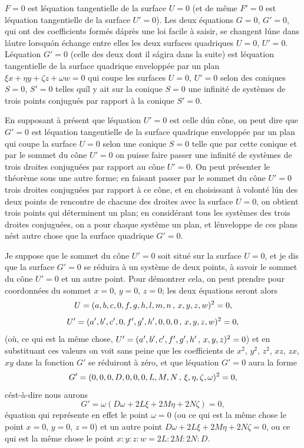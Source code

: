 \documentclass[11pt,a4paper]{article}
\theoremstyle{plain}
\begin{document}
$F=0$ est l\'equation tangentielle de la surface $U=0$ (et de m\^eme $F'=0$ est l\'equation tangentielle de la surface $U'=0$). Les deux \'equations $G=0$, $G'=0$, qui ont des coefficients form\'es d\'apr\`es une loi facile \`a saisir, se changent l\'une dans l\'autre lorsqu\'on \'echange entre elles les deux surfaces quadriques $U=0$, $U'=0$. L\'equation $G'=0$ (celle des deux dont il s\'agira dans la suite) est l\'equation tangentielle de la surface quadrique envelopp\'ee par un plan $\xi x + \eta y + \zeta z + \omega w = 0$ qui coupe les surfaces $U=0$, $U'=0$ selon des coniques $S=0$, $S'=0$ telles qu\'il y ait sur la conique $S=0$ une infinit\'e de syst\`emes de trois points conjugu\'es par rapport \`a la conique $S'=0$.

En supposant \`a pr\'esent que l\'equation $U'=0$ est celle d\'un c\^one, on peut dire que $G'=0$ est l\'equation tangentielle de la surface quadrique envelopp\'ee par un plan qui coupe la surface $U=0$ selon une conique $S=0$ telle que par cette conique et par le sommet du c\^one $U'=0$ on puisse faire passer une infinit\'e de syst\`emes de trois droites conjugu\'ees par rapport au c\^one $U'=0$. On peut pr\'esenter le th\'eor\`eme sous une autre forme; en faisant passer par le sommet du c\^one $U'=0$ trois droites conjugu\'ees par rapport \`a ce c\^one, et en choisissant \`a volont\'e l\'un des deux points de rencontre de chacune des droites avec la surface $U=0$, on obtient trois points qui d\'eterminent un plan; en consid\'erant tous les syst\`emes des trois droites conjugu\'ees, on a pour chaque syst\`eme un plan, et l\'enveloppe de ces plans n\'est autre chose que la surface quadrique $G'=0$.

Je suppose que le sommet du c\^one $U'=0$ soit situ\'e sur la surface $U=0$, et je dis que la surface $G'=0$ se r\'eduira \`a un syst\`eme de deux points, \`a savoir le sommet du c\^one $U'=0$ et un autre point. Pour d\'emontrer cela, on peut prendre pour coordonn\'ees du sommet $x=0$, $y=0$, $z=0$; les deux \'equations seront alors
\[
U = (a, b, c, 0, f, g, h, l, m, n \, \char`\,\, x, y, z, w)^2 = 0,
\]
\[
U' = (a', b', c', 0, f', g', h', 0, 0, 0 \, \char`\,\, x, y, z, w)^2 = 0,
\]
(o\`u, ce qui est la m\^eme chose, $U' = (a', b', c', f', g', h' \, \char`\,\, x, y, z)^2 = 0$) et en substituant ces valeurs on voit sans peine que les coefficients de $x^2$, $y^2$, $z^2$, $xz$, $zx$, $xy$ dans la fonction $G'$ se r\'eduiront \`a z\'ero, et que l\'equation $G'=0$ aura la forme
\[
G' = (0, 0, 0, D, 0, 0, 0, L, M, N \, \char`\,\, \xi, \eta, \zeta, \omega)^2 = 0,
\]
c\'est-\`a-dire nous aurons
\[
G' = \omega(D\omega + 2L\xi + 2M\eta + 2N\zeta) = 0,
\]
\'equation qui repr\'esente en effet le point $\omega = 0$ (ou ce qui est la m\^eme chose le point $x=0$, $y=0$, $z=0$) et un autre point $D\omega + 2L\xi + 2M\eta + 2N\zeta = 0$, ou ce qui est la m\^eme chose le point $x:y:z:w = 2L:2M:2N:D$.
\end{document}
